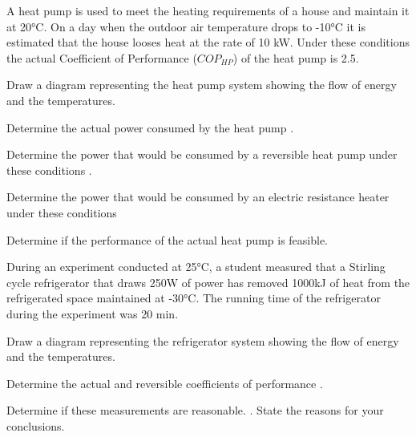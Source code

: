 \begin{homework}
  \question A heat pump is used to meet the heating requirements of a house and maintain it at 20°C. On a day when the outdoor air temperature drops to -10°C it is estimated that the house looses heat at the rate of 10 kW. Under these conditions the actual Coefficient of Performance ($COP_{HP}$) of the heat pump is 2.5.
  \begin{questionparts}
  \item Draw a diagram representing the heat pump system showing the flow of energy and the temperatures.
  \item Determine the actual power consumed by the heat pump \answer{[4 kW]}.
  \item Determine the power that would be consumed by a reversible heat pump under these conditions \answer{[1.02 kW]}.
  \item Determine the power that would be consumed by an electric resistance heater under these conditions \answer{[10 kW]}
  \item Determine if the performance of the actual heat pump is feasible.
  \end{questionparts}
  \question During an experiment conducted at 25°C, a student measured that a Stirling cycle refrigerator that draws 250W of power has removed 1000kJ of heat from the refrigerated space maintained at -30°C. The running time of the refrigerator during the experiment was 20 min.
  \begin{questionparts}
  \item Draw a diagram representing the refrigerator system showing the flow of energy and the temperatures.
  \item Determine the actual and reversible coefficients of performance \answer{[COPR = 3.33, COPR,rev = 4.42]}.
  \item Determine if these measurements are reasonable. \answer{[$COP_R/COP_{R,rev}$ = 75\% > 60\% - not feasible]}. State the reasons for your conclusions. 
  \end{questionparts}
\end{homework}
